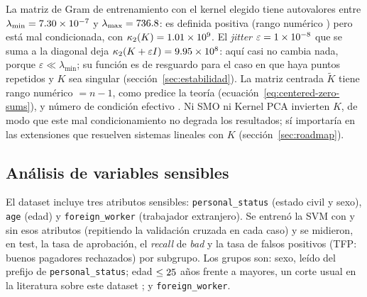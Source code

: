 \documentclass[11pt,a4paper]{article}
\newcommand{\Kc}{\widetilde{K}}                   %
\newcommand{\good}{\emph{good}}
\newcommand{\bad}{\emph{bad}}
\newcommand{\code}[1]{\texttt{#1}}
\theoremstyle{plain}
\theoremstyle{definition}
\theoremstyle{remark}
\numberwithin{equation}{section}
\begin{document}
La matriz de Gram de entrenamiento con el kernel elegido tiene autovalores entre
$\lambda_{\min}=\num{7.30e-07}$ y $\lambda_{\max}=\num{736.8}$: es definida positiva
(rango numérico \ResGramRank) pero está mal condicionada, con
$\kappa_2(K)=\num{1.01e+09}$. El \emph{jitter} $\varepsilon=\num{1e-08}$ que se suma a la
diagonal deja $\kappa_2(K+\varepsilon I)=\num{9.95e+08}$: aquí casi no cambia nada,
porque $\varepsilon\ll\lambda_{\min}$; su función es de resguardo para el caso en que haya
puntos repetidos y $K$ sea singular (sección~\ref{sec:estabilidad}). La matriz centrada
$\Kc$ tiene rango numérico \ResCenteredRank{} $=n-1$, como predice la teoría
(ecuación~\eqref{eq:centered-zero-sums}), y número de condición efectivo \ResCenteredCond.
Ni SMO ni Kernel PCA invierten $K$, de modo que este mal condicionamiento no degrada los
resultados; sí importaría en las extensiones que resuelven sistemas lineales con $K$
(sección~\ref{sec:roadmap}).

\FloatBarrier
\subsection{Análisis de variables sensibles}\label{sec:sensibles}

El dataset incluye tres atributos sensibles: \code{personal\_status} (estado civil y sexo),
\code{age} (edad) y \code{foreign\_worker} (trabajador extranjero). Se entrenó la SVM con y
sin esos atributos (repitiendo la validación cruzada en cada caso) y se midieron, en test,
la tasa de aprobación, el \emph{recall} de \bad{} y la tasa de falsos positivos (TFP: buenos
pagadores rechazados) por subgrupo. Los grupos son: sexo, leído del prefijo de
\code{personal\_status}; edad $\le\num{25}$ años frente a mayores, un corte usual en
la literatura sobre este dataset \cite{kamiran2012}; y \code{foreign\_worker}.

\begin{table}[H]
  \centering
  \small
  
  \caption{SVM con y sin atributos sensibles (test). \emph{Recall} y precisión de la clase
  \bad. $\Delta$: diferencia máxima de tasa de aprobación entre los grupos de cada atributo.}
  \label{tab:sensibles}
\end{table}

\begin{table}[H]
  \centering
  \small
  
  \caption{Métricas por subgrupo en test. Aprob.: tasa de aprobación (fracción predicha
  \good); Recall: fracción de los \bad{} del grupo detectados; TFP: fracción de los \good{}
  del grupo rechazados. $n_{\text{bad}}$ pequeños hacen poco fiables las tasas.}
  \label{tab:subgrupos}
\end{table}
\end{document}
